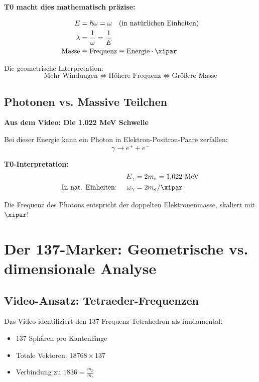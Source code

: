 	\begin{vorteil}
		\textbf{T0 macht dies mathematisch präzise:}
		
		\begin{align}
			E &= \hbar \omega = \omega \quad \text{(in natürlichen Einheiten)} \\
			\lambda &= \frac{1}{\omega} = \frac{1}{E} \\
			\text{Masse} &\equiv \text{Frequenz} \equiv \text{Energie} \cdot \xipar
		\end{align}
		
		Die geometrische Interpretation:
		\begin{equation}
			\boxed{\text{Mehr Windungen} \Leftrightarrow \text{Höhere Frequenz} \Leftrightarrow \text{Größere Masse}}
		\end{equation}
	\end{vorteil}
	
	\subsection{Photonen vs. Massive Teilchen}
	
	\textbf{Aus dem Video: Die 1.022 MeV Schwelle}
	
	Bei dieser Energie kann ein Photon in Elektron-Positron-Paare zerfallen:
	\begin{equation}
		\gamma \rightarrow e^+ + e^-
	\end{equation}
	
	\textbf{T0-Interpretation:}
	\begin{align}
		E_\gamma &= 2 m_e = 1.022 \text{ MeV} \\
		\text{In nat. Einheiten: } \quad \omega_\gamma &= 2 m_e / \xipar
	\end{align}
	
	Die Frequenz des Photons entspricht der doppelten Elektronenmasse, skaliert mit $\xipar$!
	
	\section{Der 137-Marker: Geometrische vs. dimensionale Analyse}
	
	\subsection{Video-Ansatz: Tetraeder-Frequenzen}
	
	Das Video identifiziert den 137-Frequenz-Tetrahedron als fundamental:
	\begin{itemize}
		\item 137 Sphären pro Kantenlänge
		\item Totale Vektoren: $18768 \times 137$
		\item Verbindung zu $1836 = \frac{m_p}{m_e}$
	\end{itemize}
	
